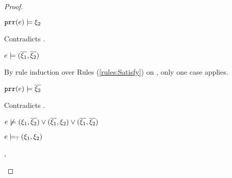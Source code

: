 \begin{proof}
\begin{byCases}
\begin{byCases}
\begin{byCases}
\begin{byCases}
\begin{byCases}
                    \begin{byCases}
                    \item[\text{(\ref{rule:CSNotValPair})}]
                        \begin{pfsteps*}
                        \item $\mathtt{prr}(e) \models \xi_2$ 
                        \end{pfsteps*}
                        Contradicts .
                    \end{byCases}
                \item[\text{(\ref{rule:CSOr2})}]
                    \begin{pfsteps*}
                    \item $e \models (\overline{\xi_1} , \overline{\xi_2})$  
                    \end{pfsteps*}
                    By rule induction over Rules (\ref{rules:Satisfy}) on , only one case applies.
                    \begin{byCases}
                    \item[\text{(\ref{rule:CSNotValPair})}]
                        \begin{pfsteps*}
                        \item $\mathtt{prr}(e) \models \overline{\xi_2}$ 
                        \end{pfsteps*}
                        Contradicts .
                    \end{byCases}
                \end{byCases}
            \end{byCases}
            \begin{pfsteps*}
            \item $e \not\models (\xi_1 , \overline{\xi_2}) \vee (\overline{\xi_1} , \xi_2) \vee (\overline{\xi_1} , \overline{\xi_2})$  
            \item $e \models_{?} (\xi_1 , \xi_2)$ 
            \end{pfsteps*}
        \item[\csatisfy{\hprl{e}}{\cdual{\xi_1}},\csatisfy{\hprr{e}}{\cdual{\xi_2}}]

\end{byCases}
\end{byCases}
\end{byCases}
\end{proof}
